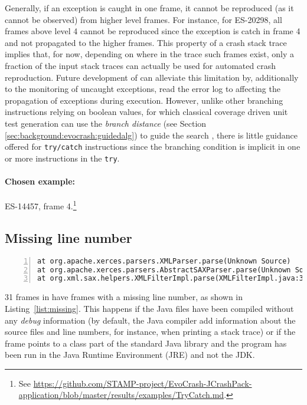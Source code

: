 Generally, if an exception is caught in one frame, it cannot be reproduced (as it cannot be observed) from higher level frames. For instance, for ES-20298, all frames above level 4 cannot be reproduced since the exception is catch in frame 4 and not propagated to the higher frames. 
This property of a crash stack trace implies that, for now, depending on where in the trace such frames exist, only a fraction of the input stack traces can actually be used for automated crash reproduction.
Future development of \evocrash can alleviate this limitation by, additionally to the monitoring of uncaught exceptions, read the error log to affecting the propagation of exceptions during execution. 
However, unlike other branching instructions relying on boolean values, for which classical coverage driven unit test generation can use the \emph{branch distance} (see Section \ref{sec:background:evocrash:guidedalg}) to guide the search \cite{McMinn2004}, there is little guidance offered for \texttt{try/catch} instructions since the branching condition is implicit in one or more instructions in the \texttt{try}. 

\paragraph{Chosen example:} 
ES-14457, frame 4.\footnote{See \url{https://github.com/STAMP-project/EvoCrash-JCrashPack-application/blob/master/results/examples/TryCatch.md}.}


\subsection{Missing line number}

\begin{lstlisting}[frame=tb,
  float=t,
  caption=An excerpt of the stack trace from the crash XRENDERING-422  with missing line numbers,
  label=list:missing,
  captionpos=t,
  basicstyle={\scriptsize\ttfamily},
  numbers=left,
  breaklines=true,
  breakatwhitespace=false,
  tabsize=3]
at org.apache.xerces.parsers.XMLParser.parse(Unknown Source)
at org.apache.xerces.parsers.AbstractSAXParser.parse(Unknown Source)
at org.xml.sax.helpers.XMLFilterImpl.parse(XMLFilterImpl.java:357)
\end{lstlisting}

31 frames in \crashpack have frames with a missing line number, as shown in Listing~\ref{list:missing}.
This happens if the Java files have been compiled without any \emph{debug} information (by default, the Java compiler add information about the source files and line numbers, for instance, when printing a stack trace) or if the frame points to a class part of the standard Java library and the program has been run in the Java Runtime Environment (JRE) and not the JDK.

